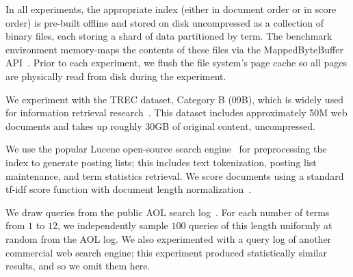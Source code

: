 {In all experiments, the appropriate index (either in document order or in score order)
is pre-built offline and stored on disk uncompressed as a collection of binary files, 
each storing a shard of data partitioned by term.  The benchmark environment memory-maps the contents 
of these files via the MappedByteBuffer API~\cite{java-bytebuffer}.
Prior to each experiment, we flush the file system's page cache so all pages are physically read from disk during the experiment.



We  experiment with the TREC dataset, Category B ({\cw}09B), which is widely used for information retrieval research~\cite{ClueWeb09}. This dataset includes approximately 50M web documents and takes up roughly 30GB of original content, uncompressed.

 
We use the popular Lucene open-source search engine~\cite{lucene} for preprocessing the index to generate posting lists; this  includes text tokenization, posting list maintenance, 
and term statistics retrieval.
We score documents using a standard tf-idf score function with document length normalization~\cite{Baeza-Yates:1999:MIR:553876}. 

We draw queries from the public AOL search log~\cite{aol}.
For each number of terms from $1$ to $12$, we independently sample $100$ queries of this length uniformly at random from the AOL log.
We also  experimented with a query log of another commercial web search engine; this experiment  
produced statistically similar results, and so we omit them here.  

}
